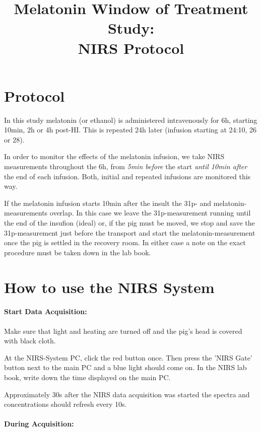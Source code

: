\documentclass[a4paper, 11pt]{article}
\title{Melatonin Window of Treatment Study: \\ NIRS Protocol}
\date{}
\begin{document}
\maketitle

\section*{Protocol} In this study melatonin (or ethanol) is administered intravenously for 6h, starting 10min, 2h or 4h post-HI. This is repeated 24h later (infusion starting at 24:10, 26 or 28).

In order to monitor the effects of the melatonin infusion, we take NIRS measurements throughout the 6h, from \emph{5min before} the start \emph{until 10min after} the end of each infusion. Both,  initial and repeated infusions are monitored this way.

If the melatonin infusion starts 10min after the insult the 31p- and melatonin-measurements overlap. In this case we leave the 31p-measurement running until the end of the insufion (ideal) or, if the pig must be moved, we stop and save the 31p-measurement just before the transport and start the melatonin-measurement once the pig is settled in the recovery room. In either case a note on the exact procedure must be taken down in the lab book.


\section*{How to use the NIRS System}

\paragraph*{Start Data Acquisition:} 

Make sure that light and heating are turned off and the pig's head is covered with black cloth. 

At the NIRS-System PC, click the red button once. Then press the 'NIRS Gate' button next to the main PC and a blue light should come on. In the NIRS lab book, write down the time displayed on the main PC. 

Approximately 30s after the NIRS data acquisition was started the spectra and concentrations should refresh every 10s. 

\paragraph*{During Acquisition:}
\end{document}
